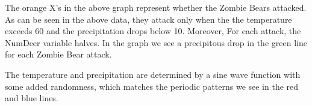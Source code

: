 \documentclass[11pt,letterpaper]{article}
\begin{document}
\begin{enumerate}
      The orange X's in the above graph represent whether the Zombie Bears 
      attacked. As can be seen in the above data, they attack only when the
      the temperature exceeds 60 and the precipitation drops below 10. Moreover,
      For each attack, the NumDeer variable halves. In the graph we see a 
      precipitous drop in the green line for each Zombie Bear attack. 

      The temperature and precipitation are determined by a sine wave function
      with some added randomness, which matches the periodic patterns we 
      see in the red and blue lines. 

\end{enumerate}
\end{document}
